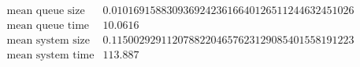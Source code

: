 \[\begin{array}{cc}
 \text{mean queue size} & 0.01016915883093692423616640126511244632451026 \\
 \text{mean queue time} & 10.0616 \\
 \text{mean system size} & 0.11500292911207882204657623129085401558191223 \\
 \text{mean system time} & 113.887 \\
\end{array}\]

